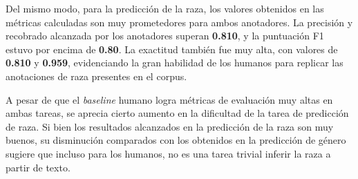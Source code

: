 Del mismo modo, para la predicci\'on de la raza, los valores obtenidos en las m\'etricas calculadas son 
muy prometedores para ambos anotadores. La precisi\'on y 
recobrado alcanzada por los anotadores superan \textbf{0.810}, y la puntuaci\'on F1 estuvo 
por encima de \textbf{0.80}. La exactitud tambi\'en fue muy alta, con valores de \textbf{0.810}
y \textbf{0.959}, evidenciando la gran habilidad de los humanos para replicar las anotaciones
de raza presentes en el corpus.

A pesar de que el \emph{baseline} humano logra m\'etricas de evaluaci\'on muy altas en ambas 
tareas, se aprecia cierto aumento en la dificultad de la tarea de predicci\'on de raza. Si bien 
los resultados alcanzados en la predicci\'on de la raza son muy buenos, su disminuci\'on 
comparados con los obtenidos en la predicci\'on de g\'enero sugiere que incluso para los humanos, 
no es una tarea trivial inferir la raza a partir de texto.